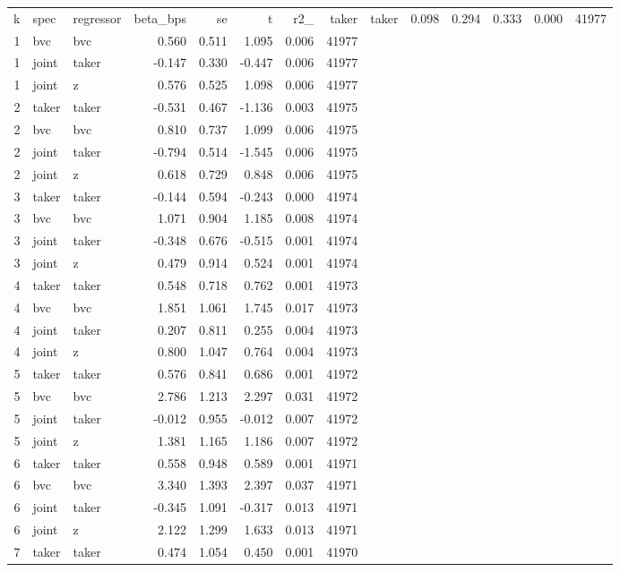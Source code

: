 \begin{tabular}{rllrrrrr}
\toprule
k & spec & regressor & beta_bps & se & t & r2_%
 & taker & taker & 0.098 & 0.294 & 0.333 & 0.000 & 41977 \\
1 & bvc & bvc & 0.560 & 0.511 & 1.095 & 0.006 & 41977 \\
1 & joint & taker & -0.147 & 0.330 & -0.447 & 0.006 & 41977 \\
1 & joint & z & 0.576 & 0.525 & 1.098 & 0.006 & 41977 \\
2 & taker & taker & -0.531 & 0.467 & -1.136 & 0.003 & 41975 \\
2 & bvc & bvc & 0.810 & 0.737 & 1.099 & 0.006 & 41975 \\
2 & joint & taker & -0.794 & 0.514 & -1.545 & 0.006 & 41975 \\
2 & joint & z & 0.618 & 0.729 & 0.848 & 0.006 & 41975 \\
3 & taker & taker & -0.144 & 0.594 & -0.243 & 0.000 & 41974 \\
3 & bvc & bvc & 1.071 & 0.904 & 1.185 & 0.008 & 41974 \\
3 & joint & taker & -0.348 & 0.676 & -0.515 & 0.001 & 41974 \\
3 & joint & z & 0.479 & 0.914 & 0.524 & 0.001 & 41974 \\
4 & taker & taker & 0.548 & 0.718 & 0.762 & 0.001 & 41973 \\
4 & bvc & bvc & 1.851 & 1.061 & 1.745 & 0.017 & 41973 \\
4 & joint & taker & 0.207 & 0.811 & 0.255 & 0.004 & 41973 \\
4 & joint & z & 0.800 & 1.047 & 0.764 & 0.004 & 41973 \\
5 & taker & taker & 0.576 & 0.841 & 0.686 & 0.001 & 41972 \\
5 & bvc & bvc & 2.786 & 1.213 & 2.297 & 0.031 & 41972 \\
5 & joint & taker & -0.012 & 0.955 & -0.012 & 0.007 & 41972 \\
5 & joint & z & 1.381 & 1.165 & 1.186 & 0.007 & 41972 \\
6 & taker & taker & 0.558 & 0.948 & 0.589 & 0.001 & 41971 \\
6 & bvc & bvc & 3.340 & 1.393 & 2.397 & 0.037 & 41971 \\
6 & joint & taker & -0.345 & 1.091 & -0.317 & 0.013 & 41971 \\
6 & joint & z & 2.122 & 1.299 & 1.633 & 0.013 & 41971 \\
7 & taker & taker & 0.474 & 1.054 & 0.450 & 0.001 & 41970 \\

\end{tabular}
